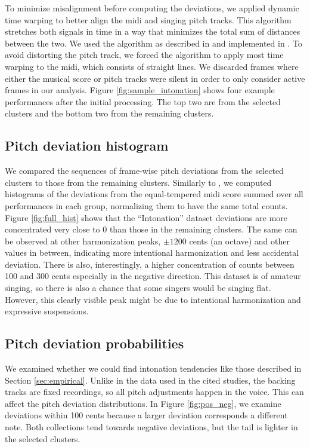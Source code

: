 To minimize misalignment before computing the deviations, we applied dynamic time warping \cite{berndt1994using} to better align the \gls{midi} and singing pitch tracks. This algorithm stretches both signals in time in a way that minimizes the total sum of distances between the two. We used the algorithm as described in \cite{muller2015fundamentals} and implemented in \cite{mcfee2015librosa}. To avoid distorting the pitch track, we forced the algorithm to apply most time warping to the \gls{midi}, which consists of straight lines. We discarded frames where either the musical score or pitch tracks were silent in order to only consider active frames in our analysis. Figure \ref{fig:sample_intonation} shows four example performances after the initial processing. The top two are from the selected clusters and the bottom two from the remaining clusters.

\subsection{Pitch deviation histogram}
We compared the sequences of frame-wise pitch deviations from the selected clusters to those from the remaining clusters. Similarly to \cite{nichols2012automatically}, we computed histograms of the deviations from the equal-tempered \gls{midi} score summed over all performances in each group, normalizing them to have the same total counts. Figure \ref{fig:full_hist} shows that the ``Intonation'' dataset deviations are more concentrated very close to 0 than those in the remaining clusters. The same can be observed at other harmonization peaks, $\pm1200$ cents (an octave) and other values in between, indicating more intentional harmonization and less accidental deviation. There is also, interestingly, a higher concentration of counts between 100 and 300 cents especially in the negative direction. This dataset is of amateur singing, so there is also a chance that some singers would be singing flat. However, this clearly visible peak might be due to intentional harmonization and expressive suspensions. 

\subsection{Pitch deviation probabilities}
We examined whether we could find intonation tendencies like those described in Section \ref{sec:empirical}. Unlike in the data used in the cited studies, the backing tracks are fixed recordings, so all pitch adjustments happen in the voice. This can affect the pitch deviation distributions. In Figure \ref{fig:pos_neg}, we examine deviations within 100 cents because a larger deviation corresponds a different note. Both collections tend towards negative deviations, but the tail is lighter in the selected clusters.

